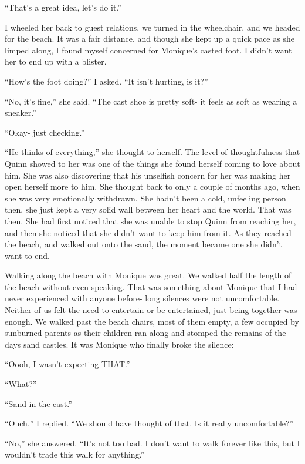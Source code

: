``That's a great idea, let's do it.''

I wheeled her back to guest relations, we turned in the wheelchair, and we headed for the
beach. It was a fair distance, and though she kept up a quick pace as she limped along, I found
myself concerned for Monique's casted foot. I didn't want her to end up with a blister.

``How's the foot doing?'' I asked. ``It isn't hurting, is it?''

``No, it's fine,'' she said. ``The cast shoe is pretty soft- it feels as soft as wearing a
sneaker.''

``Okay- just checking.''

\begin{thought}
``He thinks of everything,'' she thought to herself. The level of thoughtfulness that Quinn
showed to her was one of the things she found herself coming to love about him. She was also
discovering that his unselfish concern for her was making her open herself more to him. She
thought back to only a couple of months ago, when she was very emotionally withdrawn. She hadn't
been a cold, unfeeling person then, she just kept a very solid wall between her heart and the
world. That was then. She had first noticed that she was unable to stop Quinn from reaching her,
and then she noticed that she didn't want to keep him from it. As they reached the beach, and
walked out onto the sand, the moment became one she didn't want to end.
\end{thought}

Walking along the beach with Monique was great. We walked half the length of the beach
without even speaking. That was something about Monique that I had never experienced with anyone
before- long silences were not uncomfortable. Neither of us felt the need to entertain or be
entertained, just being together was enough. We walked past the beach chairs, most of them
empty, a few occupied by sunburned parents as their children ran along and stomped the remains
of the days sand castles. It was Monique who finally broke the silence:

``Oooh, I wasn't expecting THAT.''

``What?''

``Sand in the cast.''

``Ouch,'' I replied. ``We should have thought of that. Is it really uncomfortable?''

``No,'' she answered. ``It's not too bad. I don't want to walk forever like this, but I
wouldn't trade this walk for anything.''

